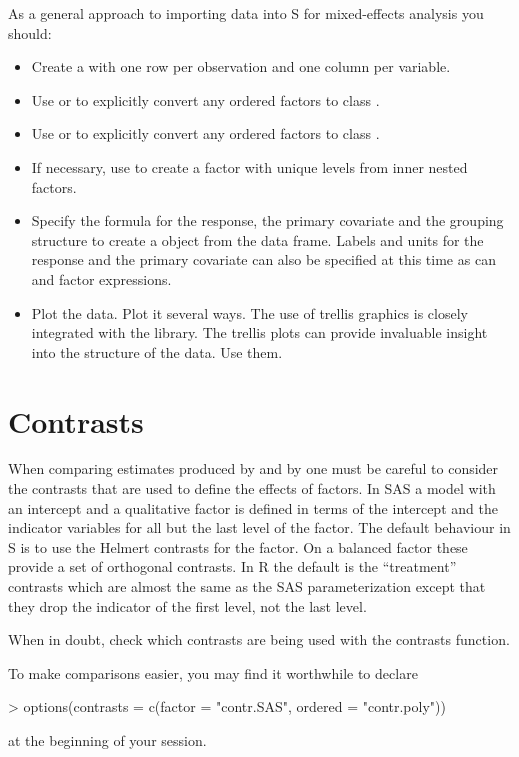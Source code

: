 \documentclass[12pt]{article}
\newcommand{\s}{\textsf{S}}
\newcommand{\R}{\textsf{R}}
\begin{document}
As a general approach to importing data into \s{} for mixed-effects
analysis you should:
\begin{itemize}
\item Create a  with one row per observation and one
  column per variable.
\item Use  or  to explicitly convert any
  ordered factors to class .
\item Use  or  to explicitly convert any
  ordered factors to class .
\item If necessary, use  to create a factor with unique
  levels from inner nested factors.
\item Specify the formula for the response, the primary covariate and
  the grouping structure to create a  object from the
  data frame.  Labels and units for the response and the primary
  covariate can also be specified at this time as can  and
   factor expressions.
\item Plot the data.  Plot it several ways.  The use of trellis
  graphics is closely integrated with the  library.  The
  trellis plots can provide invaluable insight into the structure of
  the data.  Use them.
\end{itemize}

\section{Contrasts}
\label{sec:contrasts}

When comparing estimates produced by  and by
 one must be careful to consider the contrasts that are
used to define the effects of factors.  In \textsf{SAS} a model with
an intercept and a qualitative factor is defined in terms of the
intercept and the indicator variables for all but the last level of
the factor.  The default behaviour in \s{} is to use the Helmert
contrasts for the factor.  On a balanced factor these provide a set of 
orthogonal contrasts.  In \R{} the default is the ``treatment''
contrasts which are almost the same as the SAS parameterization except 
that they drop the indicator of the first level, not the last level.

When in doubt, check which contrasts are being used with the
\textsf{contrasts} function.

To make comparisons easier, you may find it worthwhile to declare
\begin{Schunk}
\begin{Sinput}
> options(contrasts = c(factor = "contr.SAS", ordered = "contr.poly"))
\end{Sinput}
\end{Schunk}
at the beginning of your session.
\end{document}
